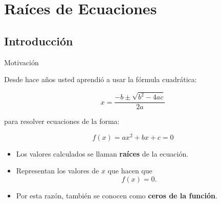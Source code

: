 \documentclass[../../main.tex]{subfiles}
\begin{document}
\section{Raíces de Ecuaciones}


\subsection{Introducción}

\begin{frame}{Motivación}

Desde hace años usted aprendió a usar la fórmula cuadrática:

\[
x = \frac{-b \pm \sqrt{b^2 - 4ac}}{2a}
\]

para resolver ecuaciones de la forma:

\[
f(x)=ax^2+bx+c=0
\]

\begin{itemize}
    \item Los valores calculados se llaman \textbf{raíces} de la ecuación.
    \item Representan los valores de \(x\) que hacen que
    \[
    f(x)=0.
    \]
    \item Por esta razón, también se conocen como \textbf{ceros de la función}.
\end{itemize}

\end{frame}


\end{document}
